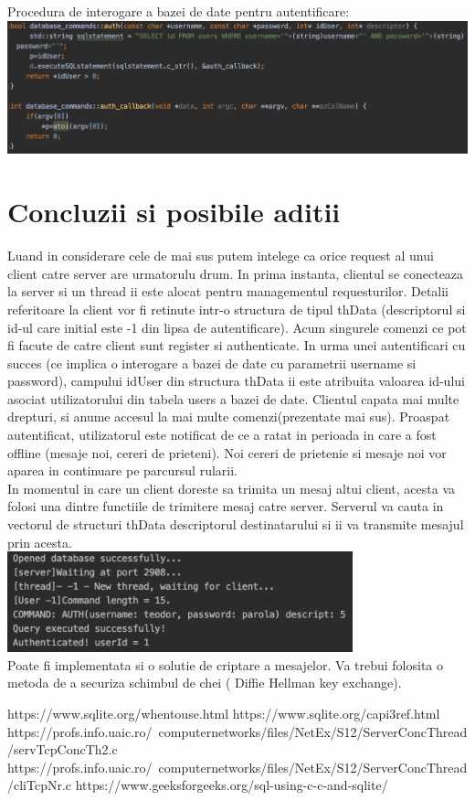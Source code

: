 \documentclass[runningheads]{llncs}
\begin{document}
Procedura de interogare a bazei de date pentru autentificare:\\
\includegraphics[width=145mm,scale=1]{retele_pics/db_query.png}\\
\section{Concluzii si posibile aditii}
Luand in considerare cele de mai sus putem intelege ca orice request al unui client catre server are urmatorulu drum. In prima instanta, clientul se conecteaza la server si un thread ii este alocat pentru managementul requesturilor. Detalii referitoare la client vor fi retinute intr-o structura de tipul thData (descriptorul si id-ul care initial este -1 din lipsa de autentificare). Acum singurele comenzi ce pot fi facute de catre client sunt register si authenticate. In urma unei autentificari cu succes (ce implica o interogare a bazei de date cu parametrii username si password), campului idUser din structura thData ii este atribuita valoarea id-ului asociat utilizatorului din tabela users a bazei de date. Clientul capata mai multe drepturi, si anume accesul la mai multe comenzi(prezentate mai sus). Proaspat autentificat, utilizatorul este notificat de ce a ratat in perioada in care a fost offline (mesaje noi, cereri de prieteni). Noi cereri de prietenie si mesaje noi vor aparea in continuare pe parcursul rularii.\\
In momentul in care un client doreste sa trimita un mesaj altui client, acesta va folosi una dintre functiile de trimitere mesaj catre server. Serverul va cauta in vectorul de structuri thData descriptorul destinatarului si ii va transmite mesajul prin acesta.\\
\includegraphics[width=100mm,scale=1]{retele_pics/auth_test.png}\\
Poate fi implementata si o solutie de criptare a mesajelor. Va trebui folosita o metoda de a securiza schimbul de chei ( Diffie Hellman key exchange).\\
\begin{thebibliography}{8}
https://www.sqlite.org/whentouse.html
https://www.sqlite.org/capi3ref.html
https://profs.info.uaic.ro/~computernetworks/files/NetEx/S12/ServerConcThread/servTcpConcTh2.c
https://profs.info.uaic.ro/~computernetworks/files/NetEx/S12/ServerConcThread/cliTcpNr.c
https://www.geeksforgeeks.org/sql-using-c-c-and-sqlite/
\end{thebibliography}
\end{document}
